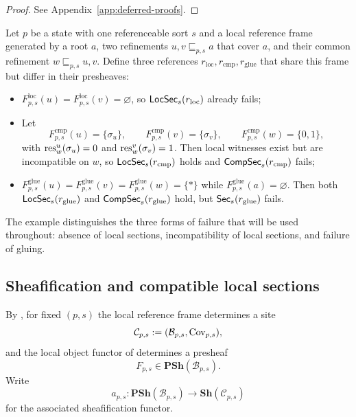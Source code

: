\begin{proof}
See Appendix~\ref{app:deferred-proofs}.
\end{proof}

\begin{example}\label{ex:toy-loc-comp-sec}
Let $p$ be a state with one referenceable sort $s$ and a local reference frame generated by a root $a$, two refinements $u,v\sqsubseteq_{p,s} a$ that cover $a$, and their common refinement $w\sqsubseteq_{p,s} u,v$. Define three references $r_{\mathrm{loc}}, r_{\mathrm{cmp}}, r_{\mathrm{glue}}$ that share this frame but differ in their presheaves:
\begin{itemize}[nosep]
\item $F_{p,s}^{\mathrm{loc}}(u)=F_{p,s}^{\mathrm{loc}}(v)=\varnothing$, so $\mathsf{LocSec}_s(r_{\mathrm{loc}})$ already fails;
\item Let
\[
F_{p,s}^{\mathrm{cmp}}(u)=\{\sigma_u\},\qquad
F_{p,s}^{\mathrm{cmp}}(v)=\{\sigma_v\},\qquad
F_{p,s}^{\mathrm{cmp}}(w)=\{0,1\},
\]
with $\mathrm{res}_w^u(\sigma_u)=0$ and $\mathrm{res}_w^v(\sigma_v)=1$.
Then local witnesses exist but are incompatible on $w$, so $\mathsf{LocSec}_s(r_{\mathrm{cmp}})$ holds and $\mathsf{CompSec}_s(r_{\mathrm{cmp}})$ fails;
\item $F_{p,s}^{\mathrm{glue}}(u)=F_{p,s}^{\mathrm{glue}}(v)=F_{p,s}^{\mathrm{glue}}(w)=\{*\}$ while $F_{p,s}^{\mathrm{glue}}(a)=\varnothing$.
Then both $\mathsf{LocSec}_s(r_{\mathrm{glue}})$ and $\mathsf{CompSec}_s(r_{\mathrm{glue}})$ hold, but $\mathsf{Sec}_s(r_{\mathrm{glue}})$ fails.
\end{itemize}
The example distinguishes the three forms of failure that will be used throughout: absence of local sections, incompatibility of local sections, and failure of gluing.
\end{example}

\subsection{Sheafification and compatible local sections}

By , for fixed $(p,s)$ the local reference frame determines a site
\[
\mathcal{C}_{p,s}:=(\mathcal{B}_{p,s},\mathrm{Cov}_{p,s}),
\]
and the local object functor of  determines a presheaf
\[
F_{p,s}\in\mathbf{PSh}(\mathcal{B}_{p,s}).
\]
Write
\[
a_{p,s}:\mathbf{PSh}(\mathcal{B}_{p,s})\to\mathbf{Sh}(\mathcal{C}_{p,s})
\]
for the associated sheafification functor.


